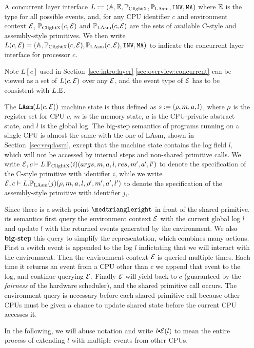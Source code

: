 \begin{definition}
A concurrent layer interface $L :=(\mathbb{A}, \mathbb{E}, \mathbb{P}_{\mathrm{ClightX}}, \mathbb{P}_{\mathrm{LAsm}}, {\texttt{INV}}, {\texttt{MA}})$ where 
$\mathbb{E}$ is the type for all possible events, and, for any CPU identifier $c$ and environment 
context $\mathcal{E}$, $\mathbb{P}_{\mathrm{ClightX}}(c, \mathcal{E})$ 
and $\mathbb{P}_{\mathrm{LAsm}}(c, \mathcal{E})$ are the sets of 
available C-style and assembly-style primitives. We then write $L(c, \mathcal{E}) = (\mathbb{A}, \mathbb{P}_{\mathrm{ClightX}}(c, \mathcal{E}), \mathbb{P}_{\mathrm{LAsm}}(c, \mathcal{E}), {\texttt{INV}}, {\texttt{MA}})$ to indicate the 
concurrent layer interface for processor $c$.
\end{definition}%
\noindent
Note $L[c]$ used in Section~\ref{sec:intro:layer}-\ref{sec:overview:concurrent}
can be viewed as a set of $L(c,\mathcal{E})$ over any $\mathcal{E}$,
and the event type of $\mathcal{E}$ has to be consistent
with $L.\mathbb{E}$.

The ${\texttt{LAsm}}(L(c, \mathcal{E}))$ machine state is thus defined as $s:=(\rho, m, a, l)$,
where $\rho$ is the register set for CPU $c$,
$m$ is the memory state,
$a$ is the CPU-private abstract state,
and $l$ is the global log.
The big-step semantics of programs running on a single CPU is
almost the same with the one of LAsm,
shown in Section~\ref{sec:seq:lasm},
except that the machine state contains the log field $l$,
which will not be accessed by internal steps
and non-shared primitive calls.
We write $\mathcal{E}, c \vdash L.\mathbb{P}_{\mathrm{ClightX}}(i) (args,m, a, l,res,m',a',l')$ to denote
the specification of the C-style primitive
with identifier $i$,
while we write $\mathcal{E}, c \vdash L.\mathbb{P}_{\mathrm{LAsm}}(j) (\rho,m, a, l,\rho',m',a',l')$ to denote
the specification of the assembly-style primitive with identifier $j$,.

Since there is a switch point $\intp$ 
in front of the shared primitive,
its semantics first query the environment context $\mathcal{E}$
with the current global log $l$
and update $l$ with the returned events generated by the environment.
We also \textbf{big-step} this query to simplify the representation,
which combines many actions.
First a switch event is
appended to the log $l$ indictating that we will interact with the
environment. Then the environment context $\mathcal{E}$ is queried
multiple times. Each time it returns an event from a CPU other than
$c$ we append that event to the log, and continue querying
$\mathcal{E}$. Finally $\mathcal{E}$ will yield back to $c$
(guaranteed by the \emph{fairness} of the hardware scheduler), and
the shared primitive call occurs.
The environment query is necessary before each shared primitive call because 
other CPUs must be given a chance to update shared state before the current 
CPU accesses it. 
 In the following, we will abuse notation and write
$l \cons \oracle(l)$ to mean the entire process of extending $l$ with
multiple events from other CPUs.

